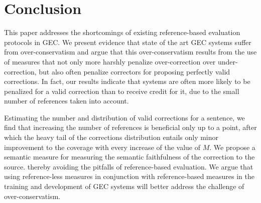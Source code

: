 \documentclass[letter,11pt]{article}
\begin{document}
%
%
%
\section{Conclusion}

This paper addresses the shortcomings of existing reference-based evaluation protocols in GEC.
We present evidence that state of the art GEC systems suffer from over-conservatism and
argue that this over-conservatism results from the use of measures that
not only more harshly penalize over-correction over under-correction,
but also often penalize correctors for proposing perfectly valid corrections.
In fact, our results indicate that systems are often more likely to be penalized for a valid correction
than to receive credit for it, due to the small number of references taken into account.

Estimating the number and distribution of valid corrections for a sentence, we find
that increasing the number of references is beneficial only up to a point, after which
the heavy tail of the corrections distribution entails only minor improvement to the coverage
with every increase of the value of $M$. 
We propose a semantic measure for measuring the semantic faithfulness of the correction to the source.
thereby avoiding the pitfalls of reference-based evaluation. We argue that using reference-less
measures in conjunction with reference-based measures in the training and development of GEC
systems will better address the challenge of over-conservatism.
\end{document}
